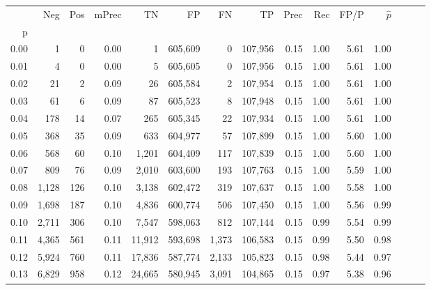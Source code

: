 \begin{tabular}{rrrrrrrrrrrrrrr}
\toprule
{} &      Neg &     Pos & mPrec &       TN &       FP &       FN &       TP &  Prec &   Rec &  FP/P & $\hat{p}$ \\
p    &          &         &       &          &          &          &          &       &       &       &           \\
\midrule
0.00 &        1 &       0 &  0.00 &        1 &  605,609 &        0 &  107,956 &  0.15 &  1.00 &  5.61 &      1.00 \\
0.01 &        4 &       0 &  0.00 &        5 &  605,605 &        0 &  107,956 &  0.15 &  1.00 &  5.61 &      1.00 \\
0.02 &       21 &       2 &  0.09 &       26 &  605,584 &        2 &  107,954 &  0.15 &  1.00 &  5.61 &      1.00 \\
0.03 &       61 &       6 &  0.09 &       87 &  605,523 &        8 &  107,948 &  0.15 &  1.00 &  5.61 &      1.00 \\
0.04 &      178 &      14 &  0.07 &      265 &  605,345 &       22 &  107,934 &  0.15 &  1.00 &  5.61 &      1.00 \\
0.05 &      368 &      35 &  0.09 &      633 &  604,977 &       57 &  107,899 &  0.15 &  1.00 &  5.60 &      1.00 \\
0.06 &      568 &      60 &  0.10 &    1,201 &  604,409 &      117 &  107,839 &  0.15 &  1.00 &  5.60 &      1.00 \\
0.07 &      809 &      76 &  0.09 &    2,010 &  603,600 &      193 &  107,763 &  0.15 &  1.00 &  5.59 &      1.00 \\
0.08 &    1,128 &     126 &  0.10 &    3,138 &  602,472 &      319 &  107,637 &  0.15 &  1.00 &  5.58 &      1.00 \\
0.09 &    1,698 &     187 &  0.10 &    4,836 &  600,774 &      506 &  107,450 &  0.15 &  1.00 &  5.56 &      0.99 \\
0.10 &    2,711 &     306 &  0.10 &    7,547 &  598,063 &      812 &  107,144 &  0.15 &  0.99 &  5.54 &      0.99 \\
0.11 &    4,365 &     561 &  0.11 &   11,912 &  593,698 &    1,373 &  106,583 &  0.15 &  0.99 &  5.50 &      0.98 \\
0.12 &    5,924 &     760 &  0.11 &   17,836 &  587,774 &    2,133 &  105,823 &  0.15 &  0.98 &  5.44 &      0.97 \\
0.13 &    6,829 &     958 &  0.12 &   24,665 &  580,945 &    3,091 &  104,865 &  0.15 &  0.97 &  5.38 &      0.96 \\

\end{tabular}
